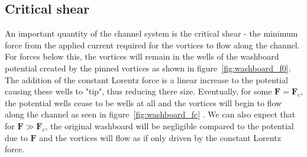 \documentclass{article}
\numberwithin{equation}{section}
\begin{document}
\subsection{Critical shear} \label{sec:critical_shear}
An important quantity of the channel system is the critical shear - the minimum force from the applied current required for the vortices to flow along the channel. For forces below this, the vortices will remain in the wells of the washboard potential created by the pinned vortices as shown in figure~\ref{fig:washboard_f0}. The addition of the constant Lorentz force is a linear increase to the potential causing these wells to "tip", thus reducing there size. Eventually, for some $\mathbf{F}=\mathbf{F}_c$, the potential wells cease to be wells at all and the vortices will begin to flow along the channel as seen in figure~\ref{fig:washboard_fc} \cite{Gartlan2020NovelFibres, Watkins2016DensitySuperconductors}. We can also expect that for $\mathbf{F}\gg\mathbf{F}_c$, the original washboard will be negligible compared to the potential due to $\mathbf{F}$ and the vortices will flow as if only driven by the constant Lorentz force.
\end{document}
